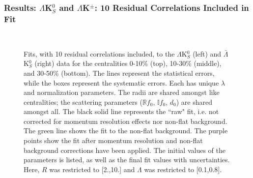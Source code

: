 \documentclass[../AnalysisNoteJBuxton.tex]{subfiles}
\begin{document}
\subsubsection{Results: \texorpdfstring{$\Lambda$K$^{0}_{S}$ and $\Lambda$K$^{\pm}$: 10 Residual Correlations Included in Fit}{TEXT}}
\label{ResultsLamK_10Res}


\begin{figure}[h!]
  \centering
  \\  
  \caption[$\Lambda$K$^{0}_{S}$($\bar{\Lambda}$K$^{0}_{S}$) Fits with 10 Residuals]{Fits, with 10 residual correlations included, to the $\Lambda$K$^{0}_{S}$ (left) and $\bar{\Lambda}$K$^{0}_{S}$ (right) data for the centralities 0-10\% (top), 10-30\% (middle), and 30-50\% (bottom).
The lines represent the statistical errors, while the boxes represent the systematic errors.
Each has unique $\lambda$ and normalization parameters.
The radii are shared amongst like centralities; the scattering parameters ($\mathbb{R}f_{0}$, $\mathbb{I}f_{0}$, $d_{0}$) are shared amongst all.
The black solid line represents the ``raw" fit, i.e. not corrected for momentum resolution effects nor non-flat background.  
The green line shows the fit to the non-flat background.
The purple points show the fit after momentum resolution and non-flat background corrections have been applied.
The initial values of the parameters is listed, as well as the final fit values with uncertainties.
Here, $R$ was restricted to [2.,10.] and $\Lambda$ was restricted to [0.1,0.8].}
  \label{fig:LamK0wConjFits_10Res}
\end{figure}
\end{document}
